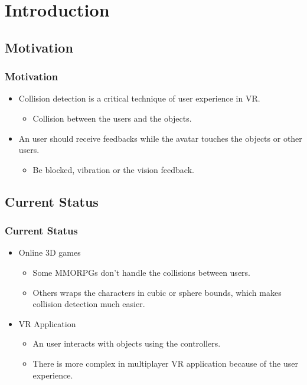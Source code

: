 \documentclass{beamer}
\begin{document}
\section{Introduction}

\subsection{Motivation}
	\begin{frame}
	\frametitle{Motivation}
	\begin{itemize}
		\item     Collision detection is a critical technique of user experience in VR.
            \begin{itemize}
                \item   Collision between the users and the objects.
            \end{itemize}
		\medskip
		\item     An user should receive feedbacks while the avatar touches the objects or other users.
            \begin{itemize}
                \item   Be blocked, vibration or the vision feedback.
            \end{itemize}
	\end{itemize}
	\end{frame}

\subsection{Current Status}
	\begin{frame}
	\frametitle{Current Status}
	\begin{itemize}
		\item Online 3D games
			\begin{itemize}
				\item Some MMORPGs don't handle the collisions between users.
				\item Others wraps the characters in cubic or sphere bounds, which makes collision detection much easier.
			\end{itemize}
		\medskip
		\item VR Application
			\begin{itemize}
				\item An user interacts with objects using the controllers.
				\item There is more complex in multiplayer VR application because of the user experience.
			\end{itemize}
	\end{itemize}
	\end{frame}
\end{document}
